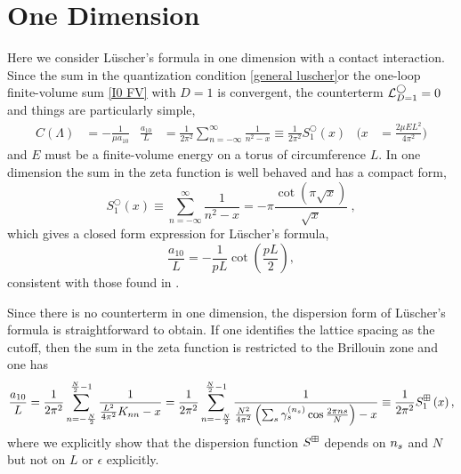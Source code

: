 \section{One Dimension}\label{sec:1D}

Here we consider L\"uscher's formula in one dimension with a contact interaction.
Since the sum in the quantization condition \eqref{general luscher}or the one-loop finite-volume sum \eqref{I0 FV} with $D=1$ is convergent, the counterterm $\mathcal{L}_{D=1}^\bigcirc=0$ and things are particularly simple,
\begin{align}
    C(\Lambda)
        &=
            -\frac{1}{\mu a_{10}}
    &
    \frac{a_{10}}{L}
        &=
            \frac{1}{2 \pi^{2}}
            \sum_{n=-\infty}^{\infty} \frac{1}{n^{2}-x}
        \equiv
            \frac{1}{2 \pi^{2}}
            S^\bigcirc_{1}\left(x\right)
    &
    \Bigg(x
        &=
            \frac{2\mu E L^2}{4\pi^2}\Bigg)
\end{align}
and $E$ must be a finite-volume energy on a torus of circumference $L$.
In one dimension the sum in the zeta function is well behaved and has a compact form,
\begin{equation}\label{eq:1d luscher}
S^\bigcirc_{1}(x) \equiv \sum_{n=-\infty}^{\infty} \frac{1}{n^{2}-x}=-\pi \frac{\cot (\pi \sqrt{x})}{\sqrt{x}}\ ,
\end{equation}
which gives a closed form expression for L\"uscher's formula,
\begin{equation}\label{eq:1d luscher}
\frac{a_{10}}{L} =-\frac{1}{pL}\cot\left(\frac{pL}{2}\right),
\end{equation}
consistent with those found in \cite{}.

Since there is no counterterm in one dimension, the dispersion form of L\"uscher's formula is straightforward to obtain.  If one identifies the lattice spacing as the cutoff, then the sum in the zeta function is restricted to the Brillouin zone and one has
\begin{equation}
    \frac{a_{10}}{L}
    =
    \frac{1}{2 \pi^{2}} \sum_{n=-\frac{N}{2}}^{\frac{N}{2}-1} \frac{1}{\frac{L^2}{4\pi^2}K_{nn}-x}
    =
    \frac{1}{2 \pi^{2}} \sum_{n=-\frac{N}{2}}^{\frac{N}{2}-1} \frac{1}{\frac{N^2}{4\pi^2}\left(\sum_{s}\gamma_s^{({n_s})}\cos\frac{2\pi n s}{N}\right)-x}
    \equiv
    \frac{1}{2 \pi^{2}} S^{\boxplus}_{1}\left(x\right),\label{eq:1d dispersion luscher}
\end{equation}
where we explicitly show that the dispersion function $S^{\boxplus}$ depends on ${n_s}$ and $N$ but not on $L$ or $\epsilon$ explicitly.


